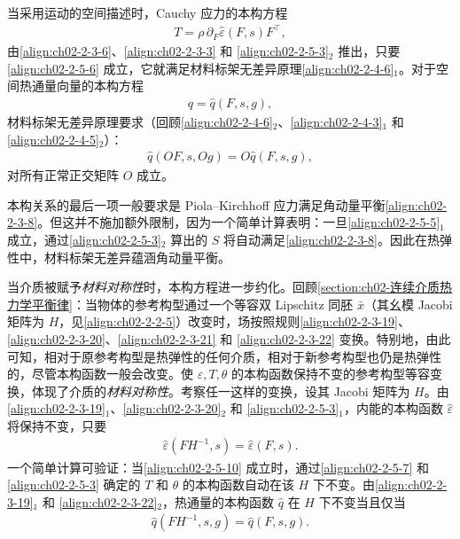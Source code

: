 \documentclass[../../main.tex]{subfiles}
\begin{document}
当采用运动的空间描述时，Cauchy 应力的本构方程
\begin{align}
T=\rho\,\partial_{F}\hat{\varepsilon}(F,s)F^{\top},
\label{align:ch02-2-5-7}
\end{align}
由\eqref{align:ch02-2-3-6}、\eqref{align:ch02-2-3-3} 和 \eqref{align:ch02-2-5-3}$_{2}$ 推出，只要\eqref{align:ch02-2-5-6} 成立，它就满足材料标架无差异原理\eqref{align:ch02-2-4-6}$_{1}$。对于空间热通量向量的本构方程
\begin{align}
q=\hat{q}(F,s,g),
\label{align:ch02-2-5-8}
\end{align}
材料标架无差异原理要求（回顾\eqref{align:ch02-2-4-6}$_{2}$、\eqref{align:ch02-2-4-3}$_{1}$ 和 \eqref{align:ch02-2-4-5}$_{2}$）：
\begin{align}
\hat{q}(OF,s,Og)=O\hat{q}(F,s,g),
\label{align:ch02-2-5-9}
\end{align}
对所有正常正交矩阵 $O$ 成立。

本构关系的最后一项一般要求是 Piola--Kirchhoff 应力满足角动量平衡\eqref{align:ch02-2-3-8}。但这并不施加额外限制，因为一个简单计算表明：一旦\eqref{align:ch02-2-5-5}$_{1}$ 成立，通过\eqref{align:ch02-2-5-3}$_{2}$ 算出的 $S$ 将自动满足\eqref{align:ch02-2-3-8}。因此在热弹性中，材料标架无差异蕴涵角动量平衡。

当介质被赋予\emph{材料对称性}时，本构方程进一步约化。回顾\cref{section:ch02-连续介质热力学平衡律}：当物体的参考构型通过一个等容双 Lipschitz 同胚 $\bar{x}$（其幺模 Jacobi 矩阵为 $H$，见\eqref{align:ch02-2-2-5}）改变时，场按照规则\eqref{align:ch02-2-3-19}、\eqref{align:ch02-2-3-20}、\eqref{align:ch02-2-3-21} 和 \eqref{align:ch02-2-3-22} 变换。特别地，由此可知，相对于原参考构型是热弹性的任何介质，相对于新参考构型也仍是热弹性的，尽管本构函数一般会改变。使 $\varepsilon,T,\theta$ 的本构函数保持不变的参考构型等容变换，体现了介质的\emph{材料对称性}。考察任一这样的变换，设其 Jacobi 矩阵为 $H$。由\eqref{align:ch02-2-3-19}$_{1}$、\eqref{align:ch02-2-3-20}$_{2}$ 和 \eqref{align:ch02-2-5-3}$_{1}$，内能的本构函数 $\hat{\varepsilon}$ 将保持不变，只要
\begin{align}
\hat{\varepsilon}(FH^{-1},s)=\hat{\varepsilon}(F,s).
\label{align:ch02-2-5-10}
\end{align}
一个简单计算可验证：当\eqref{align:ch02-2-5-10} 成立时，通过\eqref{align:ch02-2-5-7} 和 \eqref{align:ch02-2-5-3} 确定的 $T$ 和 $\theta$ 的本构函数自动在该 $H$ 下不变。由\eqref{align:ch02-2-3-19}$_{1}$ 和 \eqref{align:ch02-2-3-22}$_{2}$，热通量的本构函数 $\hat{q}$ 在 $H$ 下不变当且仅当
\begin{align}
\hat{q}(FH^{-1},s,g)=\hat{q}(F,s,g).
\label{align:ch02-2-5-11}
\end{align}
\end{document}

